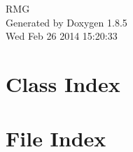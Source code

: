 \documentclass[twoside]{book}
\newcommand{\clearemptydoublepage}{%
  \newpage{\pagestyle{empty}\cleardoublepage}%
}
\begin{document}
\hypersetup{pageanchor=false}
\begin{titlepage}
\vspace*{7cm}
\begin{center}%
{\Large R\-M\-G }\\
\vspace*{1cm}
{\large Generated by Doxygen 1.8.5}\\
\vspace*{0.5cm}
{\small Wed Feb 26 2014 15:20:33}\\
\end{center}
\end{titlepage}
\clearemptydoublepage
\tableofcontents
\clearemptydoublepage
{}
\hypersetup{pageanchor=true}

\chapter{Class Index}

\chapter{File Index}

\end{document}
